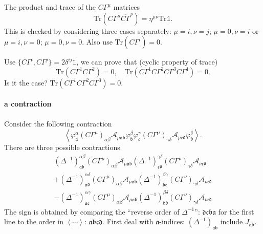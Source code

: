 
The product and trace of the $C\Gamma^\mu$ matrices
\[
	\mathrm{Tr}(C \Gamma^\mu \overline{C\Gamma}^\nu ) = \eta^{\mu\nu}
	\mathrm{Tr}\mathds{1}
.\] 
This is checked by considering three cases separately:
$\mu = i,\nu = j$; $\mu = 0,\nu = i$ or $\mu = i, \nu=0$;
$\mu=0,\nu=0$.
Also use $\mathrm{Tr}(C\Gamma^i)=0$.

Use $\{C\Gamma^i,C\Gamma^j\} = 2 \delta^{ij} \mathds{1}$,
we can prove that (cyclic property of trace)
\[
\mathrm{Tr}(C\Gamma^1 C\Gamma^2 )=0,\quad
\mathrm{Tr}(C\Gamma^1 C\Gamma^2 C\Gamma^3 C\Gamma^4)=0
.\] 
Is it the case? $\mathrm{Tr}(C\Gamma^1 C\Gamma^2 C\Gamma^3) = 0$.

\paragraph{a contraction}
Consider the following contraction
\[
	\left<\varphi^\alpha_{\mathfrak{a}} (C\Gamma^\mu)_{\alpha\beta}
	\mathcal{A}_{\mu \mathfrak{a}\mathfrak{b}} \varphi^\beta_{\mathfrak{b}}
	\varphi^\gamma_{\mathfrak{c}} (C\Gamma^\mu)_{\gamma\delta}
		\mathcal{A}_{\mu \mathfrak{c}\mathfrak{d}} \varphi^\delta_{\mathfrak{d}}
		\right>
.\] 
There are three possible contractions
\begin{align*}
	(\Delta^{-1})_{\mathfrak{a}\mathfrak{b}}^{\alpha\beta}
	(C\Gamma^\mu)_{\alpha\beta}
	\mathcal{A}_{\mu \mathfrak{a}\mathfrak{b}}
	(\Delta^{-1})_{\mathfrak{c}\mathfrak{d}}^{\gamma\delta}
	(C\Gamma^\nu)_{\gamma\delta}
	\mathcal{A}_{\nu \mathfrak{c}\mathfrak{d}} \\
	+(\Delta^{-1})_{\mathfrak{a}\mathfrak{d}}^{\alpha\delta}
	(C\Gamma^\mu)_{\alpha\beta}
	\mathcal{A}_{\mu \mathfrak{a}\mathfrak{b}}
	(\Delta^{-1})_{\mathfrak{b}\mathfrak{c}}^{\beta\gamma}
	(C\Gamma^\nu)_{\gamma\delta}
	\mathcal{A}_{\nu \mathfrak{c}\mathfrak{d}}\\
	- (\Delta^{-1})_{\mathfrak{a}\mathfrak{c}}^{\alpha\gamma}
	(C\Gamma^\mu)_{\alpha\beta}
	\mathcal{A}_{\mu \mathfrak{a}\mathfrak{b}}
	(\Delta^{-1})_{\mathfrak{b}\mathfrak{d}}^{\beta\delta}
	(C\Gamma^\nu)_{\gamma\delta}
	\mathcal{A}_{\nu \mathfrak{c}\mathfrak{d}}
\end{align*}
The sign is obtained by comparing the ``reverse order of $\Delta^{-1}$'':
$ \mathfrak{d} \mathfrak{c} \mathfrak{b} \mathfrak{a}$ for the first line
to the order in $\left<\cdots \right>$: $\mathfrak{a}\mathfrak{b}
\mathfrak{c}\mathfrak{d}$.
First deal with $\mathfrak{a}$-indices: $(\Delta^{-1})_{\mathfrak{a}\mathfrak{b}}$ include $J_{\mathfrak{a}\mathfrak{b}}$.
